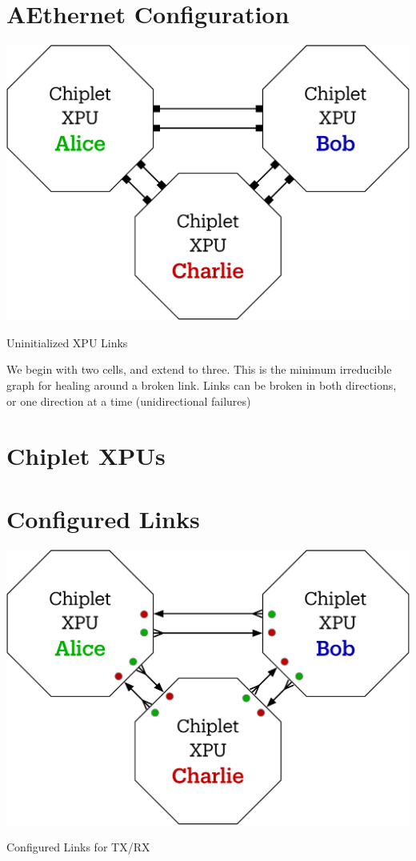 \section{AEthernet Configuration}

 \begin{marginfigure}
  \includegraphics[width=1.0\linewidth]{../../FIGURES/Chiplet-XPU.pdf}
  	\caption{Uninitialized XPU Links}
      \vspace{1em}
\end{marginfigure}


We begin with two cells, and extend to three. This is the minimum irreducible graph for healing around a broken link. Links can be broken in both directions, or one direction at a time (unidirectional failures) 

\section{Chiplet XPUs}
\section{Configured Links}
 \begin{marginfigure}
  \includegraphics[width=1.0\linewidth]{../../FIGURES/Configured-Links.pdf}
  \caption{Configured Links for TX/RX}
\end{marginfigure}



